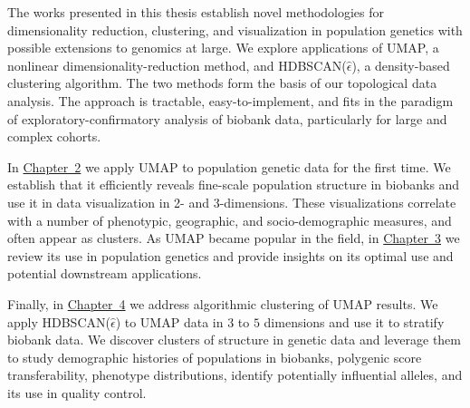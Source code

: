 The works presented in this thesis establish novel methodologies for dimensionality reduction, clustering, and visualization in population genetics with possible extensions to genomics at large. We explore applications of UMAP, a nonlinear dimensionality-reduction method, and HDBSCAN($\hat{\epsilon}$), a density-based clustering algorithm. The two methods form the basis of our topological data analysis. The approach is tractable, easy-to-implement, and fits in the paradigm of exploratory-confirmatory analysis of biobank data, particularly for large and complex cohorts.

In \hyperref[chap:chapter2]{Chapter~2} we apply UMAP to population genetic data for the first time. We establish that it efficiently reveals fine-scale population structure in biobanks and use it in data visualization in 2- and 3-dimensions. These visualizations correlate with a number of phenotypic, geographic, and socio-demographic measures, and often appear as clusters. As UMAP became popular in the field, in \hyperref[chap:chapter3]{Chapter~3} we review its use in population genetics and provide insights on its optimal use and potential downstream applications.

Finally, in \hyperref[chap:chapter4]{Chapter~4} we address algorithmic clustering of UMAP results. We apply HDBSCAN($\hat{\epsilon}$) to UMAP data in $3$ to $5$ dimensions and use it to stratify biobank data. We discover clusters of structure in genetic data and leverage them to study demographic histories of populations in biobanks, polygenic score transferability, phenotype distributions, identify potentially influential alleles, and its use in quality control.